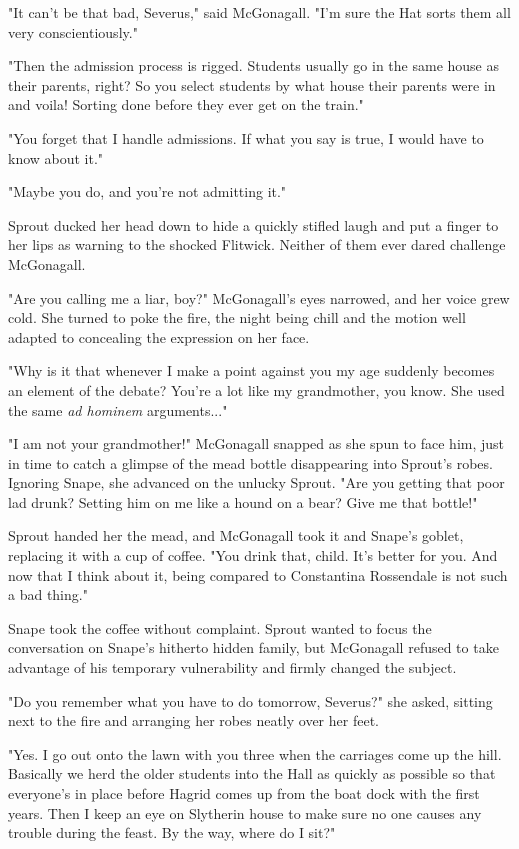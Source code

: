 "It can't be that bad, Severus," said McGonagall. "I'm sure the Hat sorts them all very conscientiously."

"Then the admission process is rigged. Students usually go in the same house as their parents, right? So you select students by what house their parents were in and voila! Sorting done before they ever get on the train."

"You forget that I handle admissions. If what you say is true, I would have to know about it."

"Maybe you do, and you're not admitting it."

Sprout ducked her head down to hide a quickly stifled laugh and put a finger to her lips as warning to the shocked Flitwick. Neither of them ever dared challenge McGonagall.

"Are you calling me a liar, boy?" McGonagall's eyes narrowed, and her voice grew cold. She turned to poke the fire, the night being chill and the motion well adapted to concealing the expression on her face.

"Why is it that whenever I make a point against you my age suddenly becomes an element of the debate? You're a lot like my grandmother, you know. She used the same \emph{ad hominem} arguments..."

"I am not your grandmother!" McGonagall snapped as she spun to face him, just in time to catch a glimpse of the mead bottle disappearing into Sprout's robes. Ignoring Snape, she advanced on the unlucky Sprout. "Are you getting that poor lad drunk? Setting him on me like a hound on a bear? Give me that bottle!"

Sprout handed her the mead, and McGonagall took it and Snape's goblet, replacing it with a cup of coffee. "You drink that, child. It's better for you. And now that I think about it, being compared to Constantina Rossendale is not such a bad thing."

Snape took the coffee without complaint. Sprout wanted to focus the conversation on Snape's hitherto hidden family, but McGonagall refused to take advantage of his temporary vulnerability and firmly changed the subject.

"Do you remember what you have to do tomorrow, Severus?" she asked, sitting next to the fire and arranging her robes neatly over her feet.

"Yes. I go out onto the lawn with you three when the carriages come up the hill. Basically we herd the older students into the Hall as quickly as possible so that everyone's in place before Hagrid comes up from the boat dock with the first years. Then I keep an eye on Slytherin house to make sure no one causes any trouble during the feast. By the way, where do I sit?"

